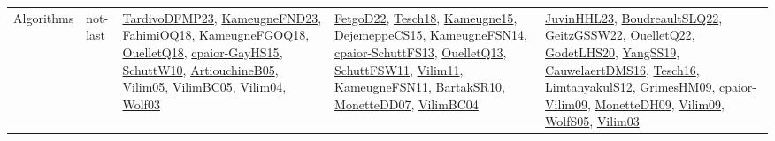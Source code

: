 {\begin{longtable}{lp{3cm}>{\raggedright}p{6cm}>{\raggedright}p{6cm}p{8cm}}
Algorithms & not-last & \href{papers/TardivoDFMP23.pdf}{TardivoDFMP23}\cite{TardivoDFMP23}, \href{papers/KameugneFND23.pdf}{KameugneFND23}\cite{KameugneFND23}, \href{articles/FahimiOQ18.pdf}{FahimiOQ18}\cite{FahimiOQ18}, \href{papers/KameugneFGOQ18.pdf}{KameugneFGOQ18}\cite{KameugneFGOQ18}, \href{papers/OuelletQ18.pdf}{OuelletQ18}\cite{OuelletQ18}, \href{papers/cpaior-GayHS15.pdf}{cpaior-GayHS15}\cite{cpaior-GayHS15}, \href{papers/SchuttW10.pdf}{SchuttW10}\cite{SchuttW10}, \href{papers/ArtiouchineB05.pdf}{ArtiouchineB05}\cite{ArtiouchineB05}, \href{papers/Vilim05.pdf}{Vilim05}\cite{Vilim05}, \href{articles/VilimBC05.pdf}{VilimBC05}\cite{VilimBC05}, \href{papers/Vilim04.pdf}{Vilim04}\cite{Vilim04}, \href{papers/Wolf03.pdf}{Wolf03}\cite{Wolf03} & \href{articles/FetgoD22.pdf}{FetgoD22}\cite{FetgoD22}, \href{papers/Tesch18.pdf}{Tesch18}\cite{Tesch18}, \href{articles/Kameugne15.pdf}{Kameugne15}\cite{Kameugne15}, \href{papers/DejemeppeCS15.pdf}{DejemeppeCS15}\cite{DejemeppeCS15}, \href{articles/KameugneFSN14.pdf}{KameugneFSN14}\cite{KameugneFSN14}, \href{papers/cpaior-SchuttFS13.pdf}{cpaior-SchuttFS13}\cite{cpaior-SchuttFS13}, \href{papers/OuelletQ13.pdf}{OuelletQ13}\cite{OuelletQ13}, \href{articles/SchuttFSW11.pdf}{SchuttFSW11}\cite{SchuttFSW11}, \href{papers/Vilim11.pdf}{Vilim11}\cite{Vilim11}, \href{papers/KameugneFSN11.pdf}{KameugneFSN11}\cite{KameugneFSN11}, \href{articles/BartakSR10.pdf}{BartakSR10}\cite{BartakSR10}, \href{papers/MonetteDD07.pdf}{MonetteDD07}\cite{MonetteDD07}, \href{papers/VilimBC04.pdf}{VilimBC04}\cite{VilimBC04} & \href{papers/JuvinHHL23.pdf}{JuvinHHL23}\cite{JuvinHHL23}, \href{papers/BoudreaultSLQ22.pdf}{BoudreaultSLQ22}\cite{BoudreaultSLQ22}, \href{papers/GeitzGSSW22.pdf}{GeitzGSSW22}\cite{GeitzGSSW22}, \href{papers/OuelletQ22.pdf}{OuelletQ22}\cite{OuelletQ22}, \href{papers/GodetLHS20.pdf}{GodetLHS20}\cite{GodetLHS20}, \href{papers/YangSS19.pdf}{YangSS19}\cite{YangSS19}, \href{papers/CauwelaertDMS16.pdf}{CauwelaertDMS16}\cite{CauwelaertDMS16}, \href{papers/Tesch16.pdf}{Tesch16}\cite{Tesch16}, \href{articles/LimtanyakulS12.pdf}{LimtanyakulS12}\cite{LimtanyakulS12}, \href{papers/GrimesHM09.pdf}{GrimesHM09}\cite{GrimesHM09}, \href{papers/cpaior-Vilim09.pdf}{cpaior-Vilim09}\cite{cpaior-Vilim09}, \href{papers/MonetteDH09.pdf}{MonetteDH09}\cite{MonetteDH09}, \href{papers/Vilim09.pdf}{Vilim09}\cite{Vilim09}, \href{papers/WolfS05.pdf}{WolfS05}\cite{WolfS05}, \href{papers/Vilim03.pdf}{Vilim03}\cite{Vilim03}\\

\end{longtable}}
